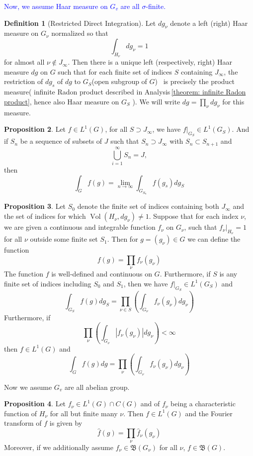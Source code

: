 \documentclass[12pt,a4paper]{book}
\newcommand{\blue}[1]{\textcolor{blue}{#1}}
\theoremstyle{definition}
\newtheorem{defn}{Definition}[section]
\newtheorem{prop}[defn]{Proposition}
\begin{document}
\blue{Now, we assume Haar measure on $G_v$ are all $\sigma$-finite.}
\begin{defn}[Restricted Direct Integration]
    Let $d g_\nu$ denote a left (right) Haar measure on $G_\nu$ normalized so that
    $$
    \int_{H_\nu} d g_\nu=1
    $$
    for almost all $\nu \notin J_{\infty}$. Then there is a unique
    left (respectively, right) Haar measure $dg$ on $G$ such that for each finite set of indices $S$ containing $J_{\infty}$, 
    the restriction of $d g_s$ of $d g$ to $G_S$(open subgroup of $G$) \
    is precisely the product measure( infinite Radon product described 
    in Analysis\,\ref{theorem: infinite Radon product}, hence also Haar measure on $G_S$ ). 
    We will write $d g=\prod_\nu d g_\nu$ for this measure.
\end{defn}
\begin{prop}
    Let $f\in L^1(G)$, for all $S\supset J_{\infty}$, we have $f|_{G_S}\in L^1(G_S)$. And if 
    $S_n$ be a sequence of subsets of $J$ such that $S_n\supset J_{\infty}$ with $S_n\subset S_{n+1}$ and 
    $$
       \bigcup_{i=1}^\infty S_n= J, 
    $$
    then 
    $$
    \int_G f(g)=\lim_{n\to \infty} \int_{G_{S_n}} f\left(g_s\right) dg_S
    $$
\end{prop}
\begin{prop}
    Let $S_0$ denote the finite set of indices containing both $J_{\infty}$ and the set of indices for which $\operatorname{Vol}\left(H_\nu, d g_\nu\right) \neq 1$. Suppose that for each index $\nu$, we are given a continuous and integrable function $f_\nu$ on $G_\nu$, such that $\left.f_\nu\right|_{H_\nu}=1$ for all $\nu$ outside some finite set $S_1$. Then for $g=\left(g_\nu\right) \in G$ we can define the function
    $$
    f(g)=\prod_\nu f_\nu\left(g_\nu\right)
    $$
    The function $f$ is well-defined and continuous on $G$. Furthermore, if $S$ is any finite set of indices including $S_0$ and $S_1$, then we have $f|_{G_S}\in  L^1(G_S)$ and 
    $$
    \int_{G_S} f(g) d g_S=\prod_{\nu \in S}\left(\int_{G_\nu} f_\nu\left(g_\nu\right) d g_\nu\right)
    $$
    Furthermore, if 
    $$
    \prod_\nu\left(\int_{G_\nu}\left|f_\nu\left(g_\nu\right)\right| d g_\nu\right)<\infty
    $$
    then $f \in L^1(G)$ and 
    $$
    \int_G f(g) d g=\prod_\nu\left(\int_{G_\nu} f_\nu\left(g_\nu\right) d g_\nu\right)
    $$
    \label{proposition: integration on restricted direct product}
\end{prop}
Now we assume $G_v$ are all abelian group.
\begin{prop}
    Let $f_{\nu}\in L^1(G)\cap C(G)$ and of $f_\nu$ being a characteristic function of $H_\nu$ for all but finite many $\nu$. 
    Then $f \in L^1(G)$ and the Fourier transform of $f$ is given by
    $$
    \hat{f}(g)=\prod_\nu \hat{f}_\nu\left(g_\nu\right)
    $$
    Moreover, if we additionally assume $f_\nu \in \mathfrak{B}\left(G_\nu\right)$ for all $\nu$, 
    $f\in\mathfrak{B}(G)$.
\end{prop}
\end{document}
